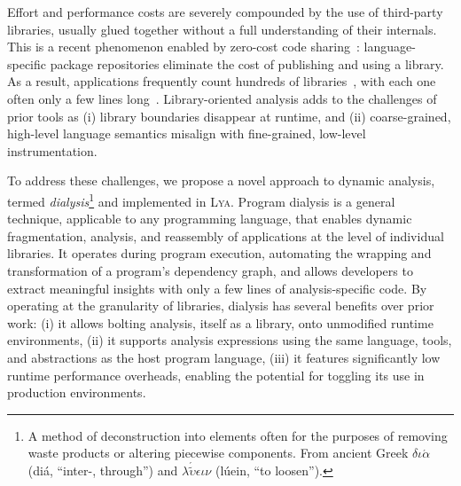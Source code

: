 \documentclass[letterpaper,twocolumn,10pt]{article}
\newcommand{\sys}{{\scshape Lya}\xspace}
\begin{document}
Effort and performance costs are severely compounded by the use of third-party libraries, usually glued together without a full understanding of their internals.
This is a recent phenomenon enabled by zero-cost code sharing~\cite{libs}:
  language-specific package repositories eliminate the cost of publishing and using a library.
As a result, applications frequently count hundreds of libraries~\cite{npmstudy:19}, with each one often only a few lines long~\cite{leftpad, npmstudy:19}. %
Library-oriented analysis adds to the challenges of prior tools as
  (i) library boundaries disappear at runtime, and
  (ii) coarse-grained, high-level language semantics misalign with fine-grained, low-level instrumentation.

To address these challenges, we propose a novel approach to dynamic analysis, termed \emph{dialysis}\footnote{
  A method of deconstruction into elements often for the purposes of removing waste products or altering piecewise components.
  From ancient Greek {\scriptsize $\delta\iota\acute{\alpha}$} (di\'{a}, ``inter-, through'') and {\scriptsize $\lambda\acute{\tilde{\upsilon}}\epsilon\iota\nu$} (lúein, ``to loosen'').
} and implemented in \sys.
Program dialysis is a general technique, applicable to any programming language, that enables dynamic fragmentation, analysis, and reassembly of applications at the level of individual libraries. 
It operates during program execution, automating the wrapping and transformation of a program's dependency graph, and allows developers to extract meaningful insights with only a few lines of analysis-specific code.
By operating at the granularity of libraries, dialysis has several benefits over prior work: %
  (i) it allows bolting analysis, itself as a library, onto unmodified runtime environments, %
  (ii) it supports analysis expressions using the same language, tools, and abstractions as the host program language,
  (iii) it features significantly low runtime performance overheads, enabling the potential for toggling its use in production environments.
\end{document}
